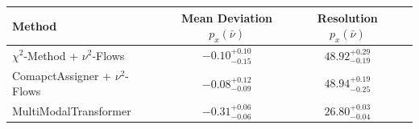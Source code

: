     \begin{tabular}{lccc}
        \toprule
        Method & Mean Deviation $p_{x}(\bar{\nu})$ & Resolution $p_{x}(\bar{\nu})$ \\
        \midrule
        $\chi^2$-Method + $\nu^2$-Flows & $-0.10^{+0.10}_{-0.15}$ & $48.92^{+0.29}_{-0.19}$ \\
        ComapctAssigner + $\nu^2$-Flows & $-0.08^{+0.12}_{-0.09}$ & $48.94^{+0.19}_{-0.25}$ \\
        MultiModalTransformer & $-0.31^{+0.06}_{-0.06}$ & $26.80^{+0.03}_{-0.04}$ \\
        \bottomrule
    \end{tabular}